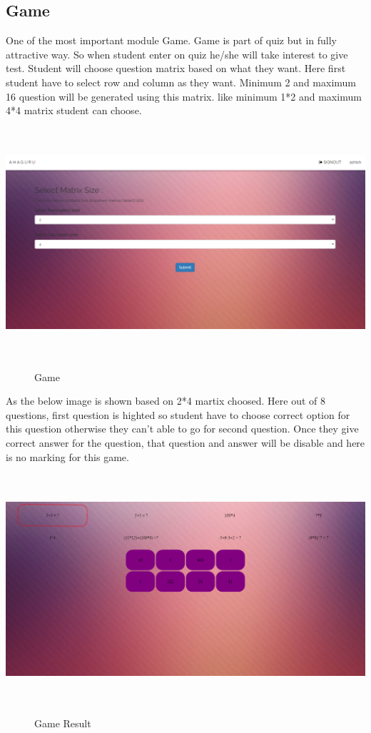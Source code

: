 \subsection{Game}
One of the most important module Game. Game is part of quiz but in fully attractive way. So when student enter on quiz he/she will take interest to give test. Student will choose question matrix based on what they want. Here first student have to select row and column as they want. Minimum 2 and maximum 16 question will be generated using this matrix. like minimum 1*2 and maximum 4*4 matrix student can choose.
\begin{center}
	\includegraphics[width=13.5cm,
	 height=8.5cm]{game.png}
	\begin{figure}[h!]
		\centering
		\caption{Game}%
	\end{figure}
\end{center}\break

As the below image is shown based on 2*4 martix choosed. Here out of 8 questions, first question is highted so student have to choose correct option for this question otherwise they can't able to go for second question. Once they give correct answer for the question, that question and answer will be disable and here is no marking for this game.
\begin{center}
	\includegraphics[width=13.5cm,
	height=8.5cm]{game_page.png}
	\begin{figure}[h!]
		\centering
		\caption{Game Result}%
	\end{figure}
\end{center}\break
